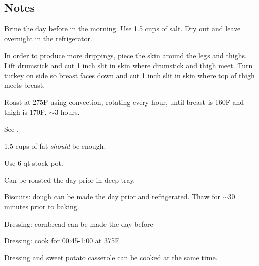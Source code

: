 \documentclass[oneside]{book}  %
\newcommand{\degF}{\textdegree F\xspace}
\newcommand{\about}{$\sim$}
\begin{document}
\subsection{Notes}
\begin{twocols} \begin{kitchennotes}
  \item[Turkey] \begin{kitchensubnotes}
    \item Brine the day before in the morning. Use 1.5 cups of salt. Dry out and
      leave overnight in the refrigerator.
    \item In order to produce more drippings, piece the skin around the legs and
      thighs. Lift drumstick and cut 1 inch slit in skin where drumstick and
      thigh meet. Turn turkey on side so breast faces down and cut 1 inch slit
      in skin where top of thigh meets breast.
    \item Roast at 275\degF using convection, rotating every hour, until breast
      is 160\degF and thigh is 170\degF, \about 3 hours.
  \end{kitchensubnotes}

  \item[Gravy] \begin{kitchensubnotes}
    \item See .
    \item 1.5 cups of fat \emph{should} be enough.
    \item Use 6 qt stock pot.
  \end{kitchensubnotes}

  \item[Sweet Potatoes]
  Can be roasted the day prior in deep tray.

  \item[Miscellaneous]
    \begin{kitchensubnotes}
      \item Biscuits: dough can be made the day prior and refrigerated. Thaw for
        \about 30 minutes prior to baking.
      \item Dressing: cornbread can be made the day before
      \item Dressing: cook for 00:45-1:00 at 375\degF
      \item Dressing and sweet potato casserole can be cooked at the same time.
    \end{kitchensubnotes}
\end{kitchennotes} \end{twocols}
\end{document}
